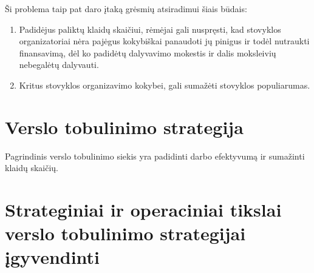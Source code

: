 Ši problema taip pat daro įtaką grėsmių atsiradimui šiais būdais:
\begin{enumerate}
  \item Padidėjus paliktų klaidų skaičiui, rėmėjai gali nuspręsti, kad 
    stovyklos organizatoriai nėra pajėgus kokybiškai panaudoti jų pinigus
    ir todėl nutraukti finansavimą, dėl ko padidėtų dalyvavimo mokestis ir
    dalis moksleivių nebegalėtų dalyvauti.
  \item Kritus stovyklos organizavimo kokybei, gali sumažėti stovyklos
    populiarumas.
\end{enumerate}



\section{Verslo tobulinimo strategija}

Pagrindinis verslo tobulinimo siekis yra padidinti darbo efektyvumą ir 
sumažinti klaidų skaičių.

\section{Strateginiai ir operaciniai tikslai verslo tobulinimo %
  strategijai įgyvendinti} \label{section_strat_oper_tiksl}

